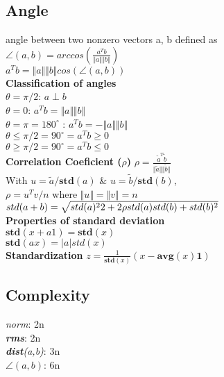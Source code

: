 \subsection{Angle}
angle between two nonzero vectors a, b defined as\\
$\angle(a,b) = arccos(\frac{a^Tb}{\Vert a \Vert \Vert b \Vert})$\\
$a^Tb = \Vert a \Vert \Vert b \Vert cos (\angle(a,b))$\\
\textbf{Classification of angles}\\

$\theta = \pi/2$: $a \perp b$\\
$\theta = 0$: $a^Tb = \Vert a \Vert \Vert b \Vert$\\
$\theta = \pi = 180^{\circ}$ : $a^Tb = -\Vert a \Vert \Vert b\Vert$\\
$\theta \leq \pi/2 = 90^{\circ} = a^Tb \geq 0$\\
$\theta \geq \pi/2 = 90^{\circ} = a^Tb \leq 0$\\
\textbf{Correlation Coeficient ($\rho$)}
$\rho = \frac{\tilde{a}^T\tilde{b}}{\Vert\tilde{a}\Vert\Vert\tilde{b}\Vert}$\\
With $u = \tilde{a}/\textbf{std}(a)$ \& $u = \tilde{b}/\textbf{std}(b)$, \\
$\rho = u^Tv/n$ where $\Vert u \Vert = \Vert v \Vert = n$\\

$std(a+b) = \\
\sqrt{std(a)^22+ 2\rho std(a)std(b) +std(b)^2}$\\
\textbf{Properties of standard deviation}\\
\textbullet  $\textbf{std}(x+a1) = \textbf{std}(x)$\\
\textbullet $\textbf{std}(ax) = |a| std(x)$\\
\textbf{Standardization}
$z = \frac{1}{\textbf{std}(x)}(x - \textbf{avg}(x)\textbf{1})$

\subsection{Complexity}
\textbullet \textit{norm}: 2n\\
\textbullet \textit{\textbf{rms}}: 2n\\
\textbullet \textit{\textbf{dist}(a,b)}: 3n\\
\textbullet \textit{$\angle(a,b)$}: 6n\\
